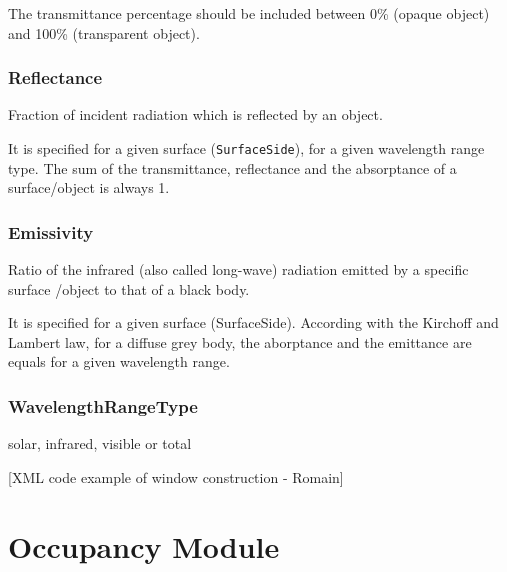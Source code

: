 \documentclass[a4paper,12pt]{article}
\let\stdsection\section%
\renewcommand\section{\newpage\stdsection}
\begin{document}
The transmittance percentage should be included between 0\% (opaque
object) and 100\% (transparent object).

\subsubsection{Reflectance}\label{reflectance}

Fraction of incident radiation which is reflected by an object.

It is specified for a given surface (\texttt{SurfaceSide}), for a given
wavelength range type. The sum of the transmittance, reflectance and the
absorptance of a surface/object is always 1.

\subsubsection{Emissivity}\label{emissivity}

Ratio of the infrared (also called long-wave) radiation emitted by a
specific surface /object to that of a black body.

It is specified for a given surface (SurfaceSide). According with the
Kirchoff and Lambert law, for a diffuse grey body, the aborptance and
the emittance are equals for a given wavelength range.

\subsubsection{WavelengthRangeType}\label{wavelengthrangetype}

solar, infrared, visible or total

{[}XML code example of window construction - Romain{]}

\section{Occupancy Module}\label{occupancy-module}
\end{document}
